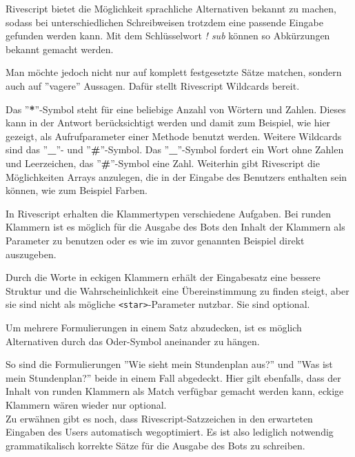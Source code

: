 Rivescript bietet die Möglichkeit sprachliche Alternativen bekannt zu machen, sodass bei unterschiedlichen Schreibweisen trotzdem eine passende Eingabe gefunden werden kann.
Mit dem Schlüsselwort \emph{! sub} können so Abkürzungen bekannt gemacht werden.


Man möchte jedoch nicht nur auf komplett festgesetzte Sätze matchen, sondern auch auf ''vagere'' Aussagen. Dafür stellt Rivescript Wildcards bereit.


Das ''\textbf{*}''-Symbol steht für eine beliebige Anzahl von Wörtern und Zahlen. Dieses kann in der Antwort berücksichtigt werden und damit zum Beispiel, wie hier gezeigt,  als Aufrufparameter einer Methode benutzt werden.
Weitere Wildcards sind das ''\textbf{\_}''- und ''\textbf{\#}''-Symbol. Das ''\textbf{\_}''-Symbol fordert ein Wort ohne Zahlen und Leerzeichen, das ''\textbf{\#}''-Symbol eine Zahl.
Weiterhin gibt Rivescript die Möglichkeiten Arrays anzulegen, die in der Eingabe des Benutzers enthalten sein können, wie zum Beispiel Farben.


In Rivescript erhalten die Klammertypen verschiedene Aufgaben. Bei runden Klammern ist es möglich für die Ausgabe des Bots den Inhalt der Klammern als Parameter zu benutzen oder es wie im zuvor genannten Beispiel direkt auszugeben.

Durch die Worte in eckigen Klammern erhält der Eingabesatz eine bessere Struktur und die Wahrscheinlichkeit eine Übereinstimmung zu finden steigt, aber sie sind nicht als mögliche \texttt{<star>}-Parameter nutzbar. Sie sind optional.

Um mehrere Formulierungen in einem Satz abzudecken, ist es möglich Alternativen durch das Oder-Symbol aneinander zu hängen.


So sind die Formulierungen ''Wie sieht mein Stundenplan aus?'' und ''Was ist mein Stundenplan?'' beide in einem Fall abgedeckt. Hier gilt ebenfalls, dass der Inhalt von runden Klammern als Match verfügbar gemacht werden kann, eckige Klammern wären wieder nur optional. \\
Zu erwähnen gibt es noch, dass Rivescript-Satzzeichen in den erwarteten Eingaben des Users automatisch wegoptimiert. Es ist also lediglich notwendig grammatikalisch korrekte Sätze für die Ausgabe des Bots zu schreiben.

